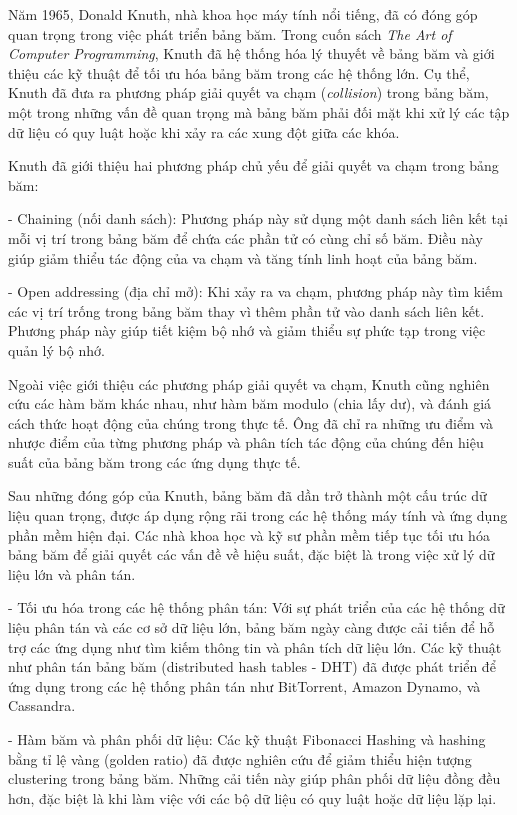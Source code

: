 \documentclass[12pt,a4paper]{report}
\begin{document}
Năm 1965, Donald Knuth, nhà khoa học máy tính nổi tiếng, đã có đóng góp quan trọng trong việc phát triển bảng băm. Trong cuốn sách \textit{The Art of Computer Programming}, Knuth đã hệ thống hóa lý thuyết về bảng băm và giới thiệu các kỹ thuật để tối ưu hóa bảng băm trong các hệ thống lớn. Cụ thể, Knuth đã đưa ra phương pháp giải quyết va chạm (\textit{collision}) trong bảng băm, một trong những vấn đề quan trọng mà bảng băm phải đối mặt khi xử lý các tập dữ liệu có quy luật hoặc khi xảy ra các xung đột giữa các khóa.

Knuth đã giới thiệu hai phương pháp chủ yếu để giải quyết va chạm trong bảng băm:

- Chaining (nối danh sách): Phương pháp này sử dụng một danh sách liên kết tại mỗi vị trí trong bảng băm để chứa các phần tử có cùng chỉ số băm. Điều này giúp giảm thiểu tác động của va chạm và tăng tính linh hoạt của bảng băm.

- Open addressing (địa chỉ mở): Khi xảy ra va chạm, phương pháp này tìm kiếm các vị trí trống trong bảng băm thay vì thêm phần tử vào danh sách liên kết. Phương pháp này giúp tiết kiệm bộ nhớ và giảm thiểu sự phức tạp trong việc quản lý bộ nhớ.

Ngoài việc giới thiệu các phương pháp giải quyết va chạm, Knuth cũng nghiên cứu các hàm băm khác nhau, như hàm băm modulo (chia lấy dư), và đánh giá cách thức hoạt động của chúng trong thực tế. Ông đã chỉ ra những ưu điểm và nhược điểm của từng phương pháp và phân tích tác động của chúng đến hiệu suất của bảng băm trong các ứng dụng thực tế.

Sau những đóng góp của Knuth, bảng băm đã dần trở thành một cấu trúc dữ liệu quan trọng, được áp dụng rộng rãi trong các hệ thống máy tính và ứng dụng phần mềm hiện đại. Các nhà khoa học và kỹ sư phần mềm tiếp tục tối ưu hóa bảng băm để giải quyết các vấn đề về hiệu suất, đặc biệt là trong việc xử lý dữ liệu lớn và phân tán.

- Tối ưu hóa trong các hệ thống phân tán: Với sự phát triển của các hệ thống dữ liệu phân tán và các cơ sở dữ liệu lớn, bảng băm ngày càng được cải tiến để hỗ trợ các ứng dụng như tìm kiếm thông tin và phân tích dữ liệu lớn. Các kỹ thuật như phân tán bảng băm (distributed hash tables - DHT) đã được phát triển để ứng dụng trong các hệ thống phân tán như BitTorrent, Amazon Dynamo, và Cassandra.

- Hàm băm và phân phối dữ liệu: Các kỹ thuật Fibonacci Hashing và hashing bằng tỉ lệ vàng (golden ratio) đã được nghiên cứu để giảm thiểu hiện tượng clustering trong bảng băm. Những cải tiến này giúp phân phối dữ liệu đồng đều hơn, đặc biệt là khi làm việc với các bộ dữ liệu có quy luật hoặc dữ liệu lặp lại.
\end{document}
